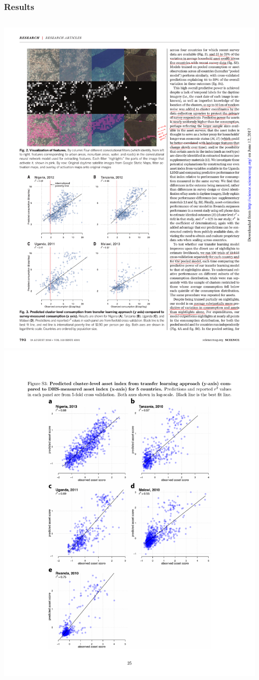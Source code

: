 \documentclass[mathserif, aspectratio=169]{beamer}
\begin{document}
\begin{frame}
	\frametitle{Results}
	\begin{columns}[c]
			\includegraphics[width=1\textwidth]{jean_fig3}
			\includegraphics[width=1.1\textwidth]{jean_figS3}

\end{columns}
\end{frame}
\end{document}
